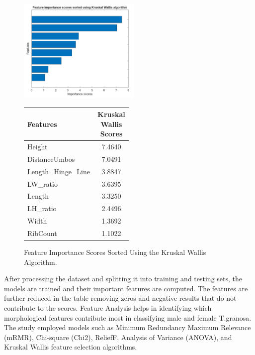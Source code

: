 \begin{figure}[!htbp]
	\centering
	\begin{minipage}{0.48\textwidth} 
		\centering
		\includegraphics[width=\textwidth, height=5cm]{figures/kw.png} 
	\end{minipage}%
	\hfill 
	\begin{minipage}{0.48\textwidth} 
		\centering
		{\fontsize{10}{12}\selectfont 
			\begin{tabular}{p{0.5\linewidth}c}
				\hline
				\textbf{Features} & \textbf{Kruskal Wallis Scores}   \\ \hline
				Height              & 7.4640  \\
				DistanceUmbos       & 7.0491  \\
				Length\_Hinge\_Line & 3.8847  \\
				LW\_ratio           & 3.6395  \\
				Length              & 3.3250 \\ 
				LH\_ratio           & 2.4496 \\
				Width               & 1.3692 \\
				RibCount            & 1.1022 \\
				\hline
			\end{tabular}
		}
	\end{minipage}
	\caption{Feature Importance Scores Sorted Using the Kruskal Wallis Algorithm.}
	\label{fig:kw-combined}
\end{figure}

\newpage

After processing the dataset and splitting it into training and testing sets, the models are trained and their important features are computed. The features are further reduced in the table removing zeros and negative results that do not contribute to the scores. Feature Analysis helps in identifying which morphological features contribute most in classifying male and female T.granosa. The study employed models such as Minimum Redundancy Maximum Relevance (mRMR), Chi-square (Chi2), ReliefF, Analysis of Variance (ANOVA), and Kruskal Wallis feature selection algorithms. 

